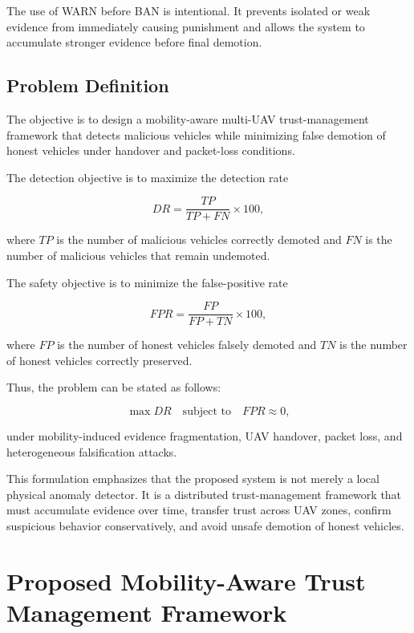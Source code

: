 \documentclass[journal]{IEEEtran}
\begin{document}
The use of WARN before BAN is intentional. It prevents isolated or weak evidence from immediately causing punishment and allows the system to accumulate stronger evidence before final demotion.

\subsection{Problem Definition}
\label{subsec:problem_definition}

The objective is to design a mobility-aware multi-UAV trust-management framework that detects malicious vehicles while minimizing false demotion of honest vehicles under handover and packet-loss conditions.

The detection objective is to maximize the detection rate

\begin{equation}
DR = \frac{TP}{TP+FN}\times 100,
\label{eq:problem_dr}
\end{equation}

where \(TP\) is the number of malicious vehicles correctly demoted and \(FN\) is the number of malicious vehicles that remain undemoted.

The safety objective is to minimize the false-positive rate

\begin{equation}
FPR = \frac{FP}{FP+TN}\times 100,
\label{eq:problem_fpr}
\end{equation}

where \(FP\) is the number of honest vehicles falsely demoted and \(TN\) is the number of honest vehicles correctly preserved.

Thus, the problem can be stated as follows:

\begin{equation}
\max DR \quad \text{subject to} \quad FPR \approx 0,
\label{eq:objective}
\end{equation}

under mobility-induced evidence fragmentation, UAV handover, packet loss, and heterogeneous falsification attacks.

This formulation emphasizes that the proposed system is not merely a local physical anomaly detector. It is a distributed trust-management framework that must accumulate evidence over time, transfer trust across UAV zones, confirm suspicious behavior conservatively, and avoid unsafe demotion of honest vehicles.

\section{Proposed Mobility-Aware Trust Management Framework}
\label{sec:proposed_framework}
\end{document}
